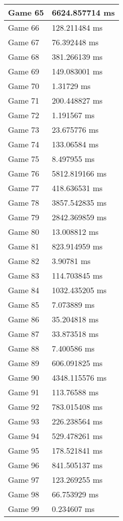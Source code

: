 \begin{multicols}{2}
\begin{tabular}{|l|l|}
	Game 65 & 6624.857714 ms \\ \hline
	Game 66 & 128.211484 ms \\ \hline
	Game 67 & 76.392448 ms \\ \hline
	Game 68 & 381.266139 ms \\ \hline
	Game 69 & 149.083001 ms \\ \hline
	Game 70 & 1.31729 ms \\ \hline
	Game 71 & 200.448827 ms \\ \hline
	Game 72 & 1.191567 ms \\ \hline
	Game 73 & 23.675776 ms \\ \hline
	Game 74 & 133.06584 ms \\ \hline
	Game 75 & 8.497955 ms \\ \hline
	Game 76 & 5812.819166 ms \\ \hline
	Game 77 & 418.636531 ms \\ \hline
	Game 78 & 3857.542835 ms \\ \hline
	Game 79 & 2842.369859 ms \\ \hline
	Game 80 & 13.008812 ms \\ \hline
	Game 81 & 823.914959 ms \\ \hline
	Game 82 & 3.90781 ms \\ \hline
	Game 83 & 114.703845 ms \\ \hline
	Game 84 & 1032.435205 ms \\ \hline
	Game 85 & 7.073889 ms \\ \hline
	Game 86 & 35.204818 ms \\ \hline
	Game 87 & 33.873518 ms \\ \hline
	Game 88 & 7.400586 ms \\ \hline
	Game 89 & 606.091825 ms \\ \hline
	Game 90 & 4348.115576 ms \\ \hline
	Game 91 & 113.76588 ms \\ \hline
	Game 92 & 783.015408 ms \\ \hline
	Game 93 & 226.238564 ms \\ \hline
	Game 94 & 529.478261 ms \\ \hline
	Game 95 & 178.521841 ms \\ \hline
	Game 96 & 841.505137 ms \\ \hline
	Game 97 & 123.269255 ms \\ \hline
	Game 98 & 66.753929 ms \\ \hline
	Game 99 & 0.234607 ms \\ \hline

\end{tabular}
\end{multicols}
